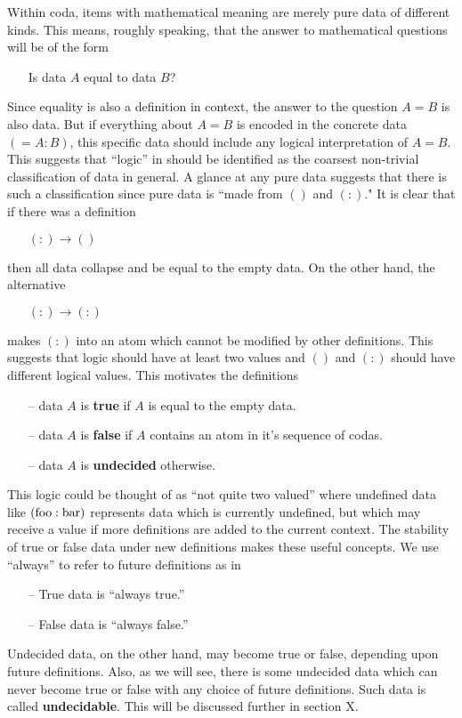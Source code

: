 \documentclass[11pt]{article}
\begin{document}
Within coda, items with mathematical meaning are merely pure data of different kinds.  This means, roughly speaking, that the answer to mathematical questions will be of the form 
\begin{itemize}
\item[] Is data $A$ equal to data $B$?
\end{itemize}
Since equality is also a definition in context, the answer to the question $A=B$ is also data.  But if everything about $A=B$ is encoded in the concrete data $(= A:B)$, this specific data should include any logical interpretation of $A=B$.  This suggests that ``logic'' in should be identified as the coarsest non-trivial classification of data in general.  A glance at any pure data suggests that there is 
such a classification since pure data is ``made from $()$ and $(:)$."  It is clear that if there was a definition
\begin{itemize}
\item[] $(:)\rightarrow ()$
\end{itemize}
then all data collapse and be equal to the empty data.  On the other hand, the alternative 
\begin{itemize}
\item[] $(:)\rightarrow (:)$
\end{itemize}
makes $(:)$ into an atom which cannot be modified by other definitions.  This suggests that logic should have at least two values and $()$ and $(:)$ should have different logical values.  This motivates the definitions
\begin{itemize}
\item[--] data $A$ is {\bf true} if $A$ is equal to the empty data. 
\item[--] data $A$ is {\bf false} if $A$ contains an atom in it's sequence of codas.
\item[--] data $A$ is {\bf undecided} otherwise. 
\end{itemize}
This logic could be thought of as ``not quite two valued'' where undefined data like $({\rm foo}:{\rm bar})$ represents data which is currently undefined, but which may receive a value if more definitions are added to the current context.  The stability of true or false data under new definitions makes these useful concepts.  We use ``always'' to refer to future definitions as in
\begin{itemize}
\item[--] True data is ``always true.''
\item[--] False data is ``always false.''
\end{itemize}
Undecided data, on the other hand, may become true or false, depending upon future definitions.  Also, as we will see, there is 
some undecided data which can never become true or false with any choice of future definitions.  Such data is called {\bf undecidable}.  This will be discussed further in section X.    
\end{document}
